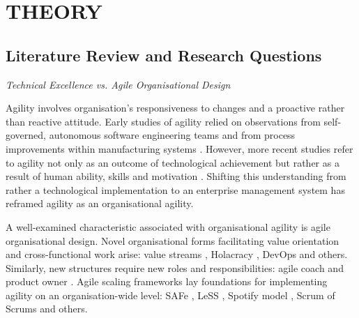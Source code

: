 \documentclass{article}
\begin{document}


\section{THEORY}
\label{sec:theory}

\subsection{Literature Review and Research Questions}
\label{subsec:lit-review}

\textit{Technical Excellence vs. Agile Organisational Design
}

Agility involves organisation's responsiveness to changes \cite{Overby2006} and a proactive rather than reactive attitude. Early studies of agility relied on observations from self-governed, autonomous software engineering teams \cite{reich1999building} and from process improvements within manufacturing systems \cite{vokurka1998journey, sharifi1999methodology, takeuchi1986}. However, more recent studies refer to agility not only as an outcome of technological achievement but rather as a result of human ability, skills and motivation \cite{sherehiy2007}. Shifting this understanding from rather a technological implementation to an enterprise management system has reframed agility as an organisational agility.

A well-examined characteristic associated with organisational agility is agile organisational design. Novel organisational forms facilitating value orientation and cross-functional work arise: value streams \cite{rother2003}, Holacracy \cite{Robertson2015, bernstein2016}, DevOps \cite{ebert2016} and others. Similarly, new structures require new roles and responsibilities: agile coach \cite{davies2009} and product owner \cite{bass2015}. Agile scaling frameworks lay foundations for implementing agility on an organisation-wide level: SAFe \cite{leffingwell2018safe}, LeSS \cite{larman2016large}, Spotify model \cite{Kniberg2012}, Scrum of Scrums \cite{Sutherland2005} and others.
\end{document}
